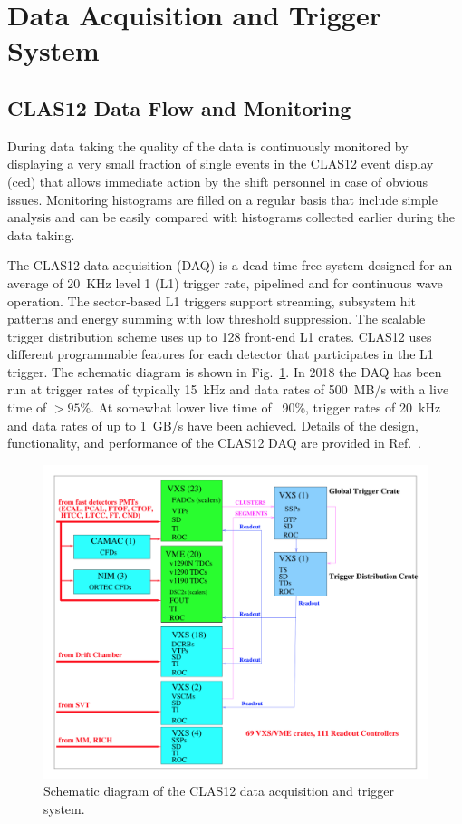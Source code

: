 \documentclass[final,3p,twocolumn]{elsarticle}
\begin{document}
\section{Data Acquisition and Trigger System} 

\subsection {CLAS12 Data Flow and Monitoring} 

During data taking the quality of the data is continuously monitored by displaying a very small fraction of single events in 
 the CLAS12 event display (ced) that allows immediate action by the shift personnel in case of obvious issues. Monitoring
 histograms are filled on a regular basis that include simple analysis and can be easily compared with histograms 
 collected earlier during the data taking.  

The CLAS12 data acquisition (DAQ) is a dead-time free system designed for an average of 20~KHz level 1 (L1) 
trigger rate, pipelined and for continuous wave operation. The sector-based  L1 triggers support streaming, subsystem 
hit patterns and energy summing with low threshold suppression.  The scalable trigger distribution scheme 
uses up to 128 front-end L1 crates. CLAS12 uses different programmable features for each detector that 
participates in the L1 trigger. The schematic diagram is shown in Fig.~\ref{daq}. In 2018 the DAQ has been run 
at trigger rates of typically 15~kHz and data rates of 500~MB/s with a live time of $> 95\%$. At somewhat 
lower live time of ~90\%, trigger rates of 20~kHz and data rates of up to 1~GB/s have been achieved.
Details of the design, functionality, and performance of the CLAS12 DAQ are provided in  Ref.~\cite{DAQ}. 
 
\begin{figure}[htbp!]
\centerline{\includegraphics[width=1.0\columnwidth]{clas12-daq.png}}
\caption{Schematic diagram of the CLAS12 data acquisition and trigger system.}
\label{daq}
\end{figure}
\end{document}
